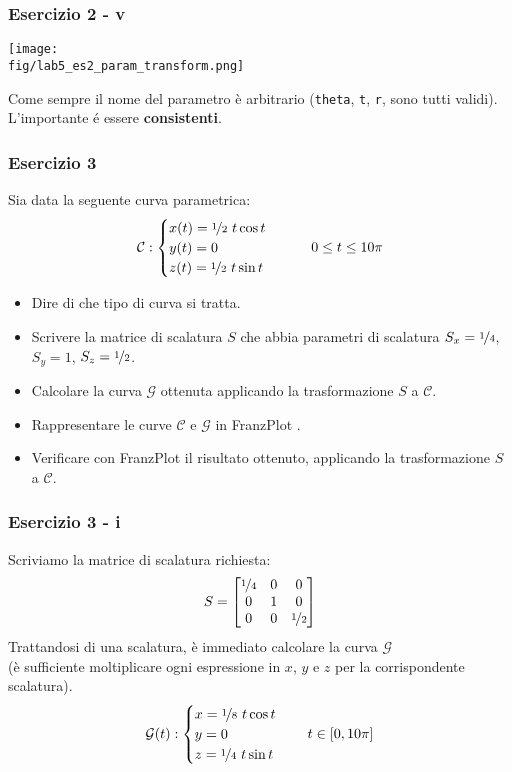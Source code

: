 \documentclass{beamer}
\newcommand{\fig}{figures} %
\newcommand{\frnzplt}{FranzPlot }
\begin{document}
\begin{frame}
\frametitle{Esercizio 2 - v}
\begin{center}
\texttt{[image: \\fig/lab5\_es2\_param\_transform.png]}
\end{center}

    Come sempre il nome del parametro \`e arbitrario (\texttt{theta}, \texttt{t}, \texttt{r}, sono tutti validi).
    L'importante \'e essere \textbf{consistenti}.
\end{frame}
%
\begin{frame}
\frametitle{Esercizio 3}
    Sia data la seguente curva parametrica:
	\begin{displaymath}
	\mathcal{C}:\begin{cases}
	x(t)=  \nicefrac{1}{2} \ t \cos t\\
	y(t)= 0 \\
        z(t)= \nicefrac{1}{2} \ t \sin t
	\end{cases}
	\qquad 0 \leq t \leq 10 \pi
	\end{displaymath}
    \begin{itemize}
        \item Dire di che tipo di curva si tratta.
        \item Scrivere la matrice di scalatura $S$ che abbia parametri di scalatura $S_x = \nicefrac{1}{4}$, $S_y = 1$, $S_z = \nicefrac{1}{2}$.
        \item Calcolare la curva $\mathcal{G}$ ottenuta applicando la trasformazione $S$ a $\mathcal{C}$.
        \item Rappresentare le curve $\mathcal{C}$ e $\mathcal{G}$ in \frnzplt.
        \item Verificare con \frnzplt il risultato ottenuto, applicando la trasformazione $S$ a $\mathcal{C}$.
    \end{itemize}
\end{frame}

\begin{frame}
\frametitle{Esercizio 3 - i}
Scriviamo la matrice di scalatura richiesta:
\begin{equation}
S = 
\begin{bmatrix}
    \nicefrac{1}{4} &       0 & 0\\
    0  & 1 & 0\\ 
    0 & 0 & \nicefrac{1}{2} 
\end{bmatrix}
\end{equation}
    Trattandosi di una scalatura, \`e immediato calcolare la curva $\mathcal{G}$ \\
    (\`e sufficiente moltiplicare ogni espressione in $x$, $y$ e $z$ per la corrispondente scalatura).
\begin{displaymath}
    \mathcal{G}(t):
\begin{cases}
    x = \nicefrac{1}{8} \ t \cos t \\
    y = 0 \\
    z = \nicefrac{1}{4} \ t \sin t
\end{cases}
\quad
    t \in [0, 10 \pi]
\end{displaymath}

\end{frame}
\end{document}
